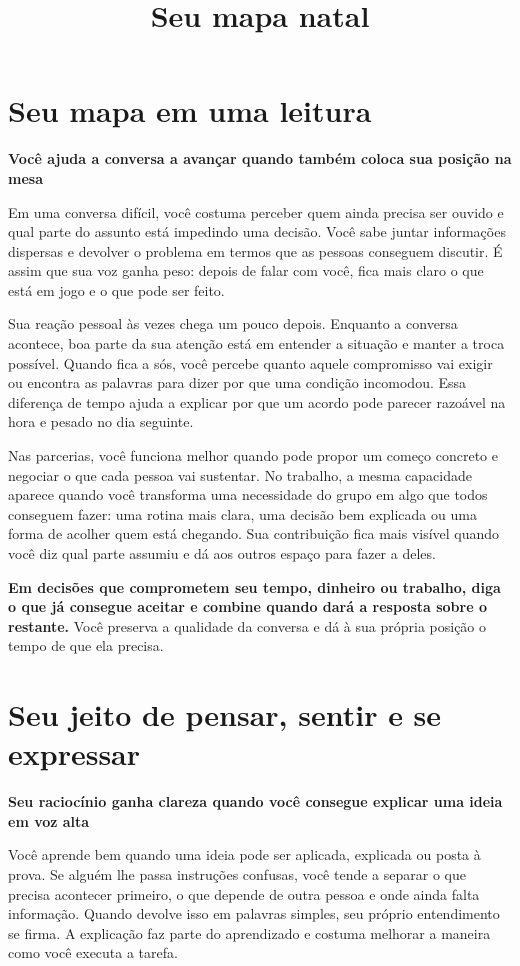 \documentclass[11pt,a4paper]{article}
\title{Seu mapa natal}
\author{}
\date{}
\newcommand{\subtituloleitura}[1]{\textbf{#1}\par\nopagebreak[4]}
\begin{document}
\maketitle

\section*{Seu mapa em uma leitura}
\subtituloleitura{Você ajuda a conversa a avançar quando também coloca sua posição na mesa}

Em uma conversa difícil, você costuma perceber quem ainda precisa ser ouvido e qual parte do assunto está impedindo uma decisão. Você sabe juntar informações dispersas e devolver o problema em termos que as pessoas conseguem discutir. É assim que sua voz ganha peso: depois de falar com você, fica mais claro o que está em jogo e o que pode ser feito.

Sua reação pessoal às vezes chega um pouco depois. Enquanto a conversa acontece, boa parte da sua atenção está em entender a situação e manter a troca possível. Quando fica a sós, você percebe quanto aquele compromisso vai exigir ou encontra as palavras para dizer por que uma condição incomodou. Essa diferença de tempo ajuda a explicar por que um acordo pode parecer razoável na hora e pesado no dia seguinte.

Nas parcerias, você funciona melhor quando pode propor um começo concreto e negociar o que cada pessoa vai sustentar. No trabalho, a mesma capacidade aparece quando você transforma uma necessidade do grupo em algo que todos conseguem fazer: uma rotina mais clara, uma decisão bem explicada ou uma forma de acolher quem está chegando. Sua contribuição fica mais visível quando você diz qual parte assumiu e dá aos outros espaço para fazer a deles.

\textbf{Em decisões que comprometem seu tempo, dinheiro ou trabalho, diga o que já consegue aceitar e combine quando dará a resposta sobre o restante.} Você preserva a qualidade da conversa e dá à sua própria posição o tempo de que ela precisa.

\clearpage
\section*{Seu jeito de pensar, sentir e se expressar}
\subtituloleitura{Seu raciocínio ganha clareza quando você consegue explicar uma ideia em voz alta}

Você aprende bem quando uma ideia pode ser aplicada, explicada ou posta à prova. Se alguém lhe passa instruções confusas, você tende a separar o que precisa acontecer primeiro, o que depende de outra pessoa e onde ainda falta informação. Quando devolve isso em palavras simples, seu próprio entendimento se firma. A explicação faz parte do aprendizado e costuma melhorar a maneira como você executa a tarefa.
\end{document}
